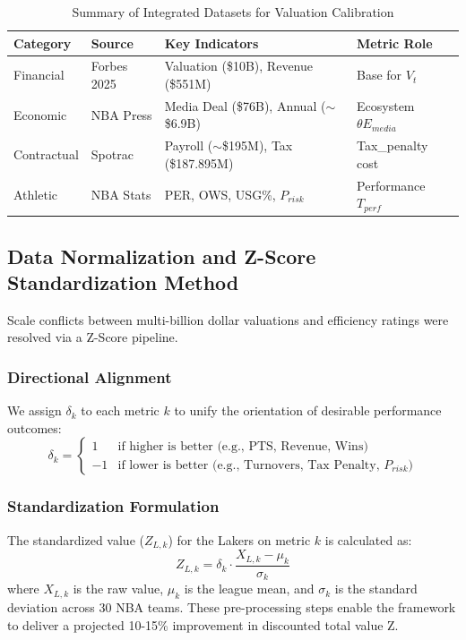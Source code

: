 \documentclass[12pt]{article}
\begin{document}
\begin{table}[H]
\centering
\caption{Summary of Integrated Datasets for Valuation Calibration}
\begin{tabular}{llll}
\toprule
\textbf{Category} & \textbf{Source} & \textbf{Key Indicators} & \textbf{Metric Role} \\
\midrule
Financial & Forbes 2025 & Valuation (\$10B), Revenue (\$551M) & Base for $V_t$ \\
Economic & NBA Press & Media Deal (\$76B), Annual ($\sim$\$6.9B) & Ecosystem $\theta E_{media}$ \\
Contractual & Spotrac & Payroll ($\sim$\$195M), Tax (\$187.895M) & Tax\_penalty cost \\
Athletic & NBA Stats & PER, OWS, USG\%, $P_{risk}$ & Performance $T_{perf}$ \\
\bottomrule
\end{tabular}
\end{table}

\subsection{Data Normalization and Z-Score Standardization Method}
Scale conflicts between multi-billion dollar valuations and efficiency ratings were resolved via a Z-Score pipeline.

\subsubsection{Directional Alignment}
We assign $\delta_k$ to each metric $k$ to unify the orientation of desirable performance outcomes:
\begin{equation}
\delta_k = \begin{cases} 
1 & \text{if higher is better (e.g., PTS, Revenue, Wins)} \\
-1 & \text{if lower is better (e.g., Turnovers, Tax Penalty, } P_{risk})
\end{cases}
\end{equation}

\subsubsection{Standardization Formulation}
The standardized value ($Z_{L,k}$) for the Lakers on metric $k$ is calculated as:
\begin{equation}
Z_{L,k} = \delta_k \cdot \frac{X_{L,k} - \mu_k}{\sigma_k}
\end{equation}
where $X_{L,k}$ is the raw value, $\mu_k$ is the league mean, and $\sigma_k$ is the standard deviation across 30 NBA teams. These pre-processing steps enable the framework to deliver a projected 10-15\% improvement in discounted total value Z.
\end{document}
